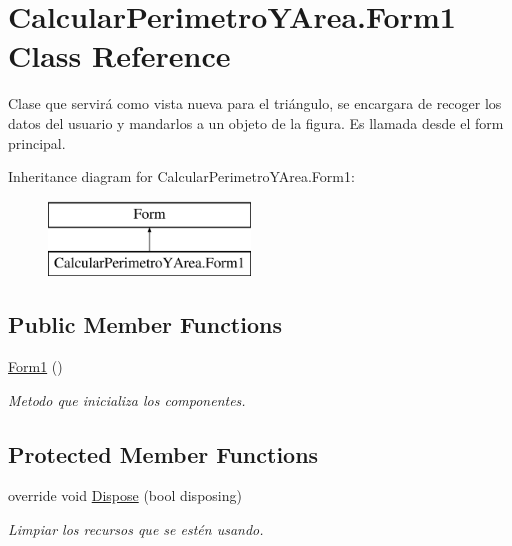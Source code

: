 \hypertarget{class_calcular_perimetro_y_area_1_1_form1}{}\section{Calcular\+Perimetro\+Y\+Area.\+Form1 Class Reference}
\label{class_calcular_perimetro_y_area_1_1_form1}


Clase que servirá como vista nueva para el triángulo, se encargara de recoger los datos del usuario y mandarlos a un objeto de la figura. Es llamada desde el form principal.  


Inheritance diagram for Calcular\+Perimetro\+Y\+Area.\+Form1\+:\begin{figure}[H]
\begin{center}
\leavevmode
\includegraphics[height=2.000000cm]{class_calcular_perimetro_y_area_1_1_form1}
\end{center}
\end{figure}
\subsection*{Public Member Functions}
\begin{DoxyCompactItemize}
\item 
\hyperlink{class_calcular_perimetro_y_area_1_1_form1_a484d4838e3f6735971072a9257334d91}{Form1} ()
\begin{DoxyCompactList}\small\item\em Metodo que inicializa los componentes. \end{DoxyCompactList}\end{DoxyCompactItemize}
\subsection*{Protected Member Functions}
\begin{DoxyCompactItemize}
\item 
override void \hyperlink{class_calcular_perimetro_y_area_1_1_form1_a4e913ec7eb241ef442a648655cdd93ba}{Dispose} (bool disposing)
\begin{DoxyCompactList}\small\item\em Limpiar los recursos que se estén usando. \end{DoxyCompactList}\end{DoxyCompactItemize}


